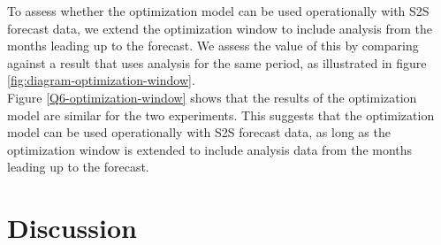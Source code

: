 \documentclass[11pt]{article}
\begin{document}
To assess whether the optimization model can be used operationally with S2S forecast data, we extend the optimization window to include analysis from the months leading up to the forecast. We assess the value of this by comparing against a result that uses analysis for the same period, as illustrated in figure \ref*{fig:diagram-optimization-window}.\\





Figure \ref*{Q6-optimization-window} shows that the results of the optimization model are similar for the two experiments. This suggests that the optimization model can be used operationally with S2S forecast data, as long as the optimization window is extended to include analysis data from the months leading up to the forecast.\\


\section*{Discussion}
\end{document}

